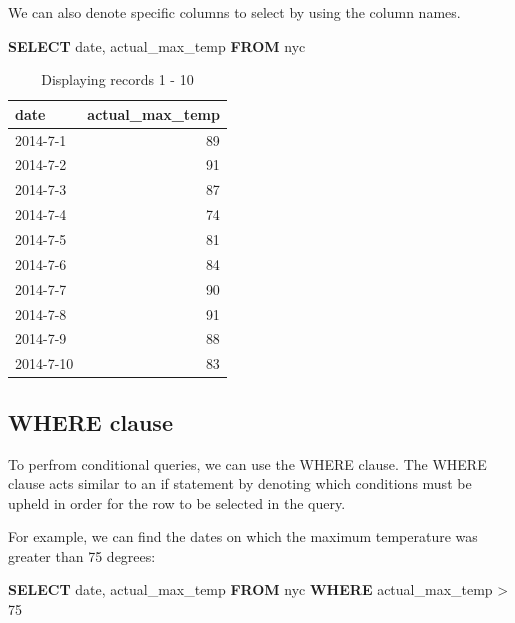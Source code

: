 \documentclass[]{book}
\newenvironment{Shaded}{\begin{snugshade}}{\end{snugshade}}
\newcommand{\KeywordTok}[1]{\textcolor[rgb]{0.13,0.29,0.53}{\textbf{#1}}}
\newcommand{\DataTypeTok}[1]{\textcolor[rgb]{0.13,0.29,0.53}{#1}}
\newcommand{\DecValTok}[1]{\textcolor[rgb]{0.00,0.00,0.81}{#1}}
\newcommand{\NormalTok}[1]{#1}
\begin{document}
We can also denote specific columns to select by using the column names.

\begin{Shaded}
\begin{Highlighting}[]
\KeywordTok{SELECT} \DataTypeTok{date}\NormalTok{, actual_max_temp }\KeywordTok{FROM}\NormalTok{ nyc}
\end{Highlighting}
\end{Shaded}

\begin{table}

\caption{\label{tab:unnamed-chunk-67}Displaying records 1 - 10}
\centering
\begin{tabular}[t]{l|r}
\hline
date & actual\_max\_temp\\
\hline
2014-7-1 & 89\\
\hline
2014-7-2 & 91\\
\hline
2014-7-3 & 87\\
\hline
2014-7-4 & 74\\
\hline
2014-7-5 & 81\\
\hline
2014-7-6 & 84\\
\hline
2014-7-7 & 90\\
\hline
2014-7-8 & 91\\
\hline
2014-7-9 & 88\\
\hline
2014-7-10 & 83\\
\hline
\end{tabular}
\end{table}

\subsection{WHERE clause}\label{where-clause}

To perfrom conditional queries, we can use the WHERE clause. The WHERE
clause acts similar to an if statement by denoting which conditions must
be upheld in order for the row to be selected in the query.

For example, we can find the dates on which the maximum temperature was
greater than 75 degrees:

\begin{Shaded}
\begin{Highlighting}[]
\KeywordTok{SELECT} \DataTypeTok{date}\NormalTok{, actual_max_temp }\KeywordTok{FROM}\NormalTok{ nyc }\KeywordTok{WHERE}\NormalTok{ actual_max_temp > }\DecValTok{75}
\end{Highlighting}
\end{Shaded}
\end{document}
